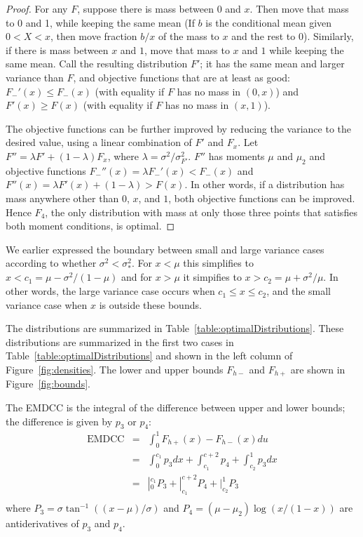 \documentclass{article}
\newcommand{\Fmin}{F_{h-}}
\newcommand{\Fmax}{F_{h+}}
\begin{document}
\begin{proof}
For any $F$,
suppose there is mass between $0$ and $x$.
Then move that mass to 0 and 1, while keeping the same mean
(If $b$ is the conditional mean given $0 < X < x$, then move
fraction $b/x$ of the mass to $x$ and the rest to $0$).
Similarly, if there is mass between $x$ and $1$, move that
mass to $x$ and $1$ while keeping the same mean.
Call the resulting distribution $F'$; it has the same mean and
larger variance than $F$,
and objective functions that are at least as good:
$F_{-}'(x) \le F_{-}(x)$ (with equality if $F$ has no mass in $(0,x)$)
and
$F'(x) \ge F(x)$ (with equality if $F$ has no mass in $(x,1)$).

The objective functions can be further improved by reducing
the variance to the desired value, using a linear combination of $F'$
and $F_x$.
Let $F'' = \lambda F' + (1-\lambda) F_x$,
where
$\lambda = \sigma^2 / \sigma^2_{F'}$.
$F''$ has moments $\mu$ and $\mu_2$
and objective functions
$F_{-}''(x) = \lambda F_{-}'(x) < F_{-}(x)$
and
$F''(x) = \lambda F'(x) + (1-\lambda) > F(x)$.
In other words, if a distribution has mass anywhere other than $0$, $x$,
and $1$, both objective functions can be improved.
Hence $F_4$, the only distribution with mass at only those three points
that satisfies both moment conditions, is optimal.
\end{proof}

We earlier expressed the boundary between small and large variance
cases according to whether $\sigma^2 < \sigma_*^2$.
For $x < \mu$ this simplifies to $x < c_1 = \mu - \sigma^2 / (1-\mu)$
and for $x > \mu$ it simpifies to $x > c_2 = \mu + \sigma^2 / \mu$.
In other words, the large variance case occurs when
$c_1 \le x \le c_2$,
and the small variance case when $x$ is outside these bounds.

The distributions are summarized in Table~\ref{table:optimalDistributions}.
These distributions are summarized in the first two cases in
Table~\ref{table:optimalDistributions}
and shown in the left column of
Figure~\ref{fig:densities}.
The lower and upper bounds $\Fmin$ and $\Fmax$ are shown
in Figure~\ref{fig:bounds}.


The EMDCC is the integral of the difference between upper and lower
bounds; the difference is given by $p_3$ or $p_4$:
\begin{eqnarray}
  \mbox{EMDCC}
  &=& \int_0^1 \Fmax(x) - \Fmin(x) du \nonumber \\
  &=& \int_0^{c_1} p_3 dx + \int_{c_1}^{c+2} p_4 + \int_{c_2}^1 p_3 dx\nonumber \\
  &=& |_0^{c_1} P_3 + |_{c_1}^{c+2} P_4 + |_{c_2}^1 P_3 \nonumber \\
\end{eqnarray}
where $P_3 = \sigma \tan^{-1}((x-\mu)/\sigma)$ and
$P_4 = (\mu - \mu_2)\log(x/(1-x))$ are antiderivatives of $p_3$ and $p_4$.
\end{document}
